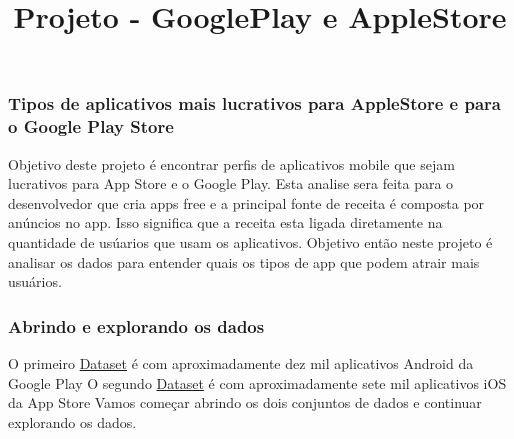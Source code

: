 \documentclass[11pt]{article}
\title{Projeto - GooglePlay e AppleStore}
\begin{document}
    
    
    \maketitle
    
    

    
    \subsubsection{Tipos de aplicativos mais lucrativos para AppleStore e
para o Google Play
Store}\label{tipos-de-aplicativos-mais-lucrativos-para-applestore-e-para-o-google-play-store}

    Objetivo deste projeto é encontrar perfis de aplicativos mobile que
sejam lucrativos para App Store e o Google Play. Esta analise sera feita
para o desenvolvedor que cria apps free e a principal fonte de receita é
composta por anúncios no app. Isso significa que a receita esta ligada
diretamente na quantidade de usúarios que usam os aplicativos. Objetivo
então neste projeto é analisar os dados para entender quais os tipos de
app que podem atrair mais usuários.

    \subsubsection{Abrindo e explorando os
dados}\label{abrindo-e-explorando-os-dados}

O primeiro
\href{https://www.kaggle.com/lava18/google-play-store-apps/home}{Dataset}
é com aproximadamente dez mil aplicativos Android da Google Play O
segundo
\href{https://www.kaggle.com/lava18/google-play-store-apps/home}{Dataset}
é com aproximadamente sete mil aplicativos iOS da App Store Vamos
começar abrindo os dois conjuntos de dados e continuar explorando os
dados.
\end{document}
